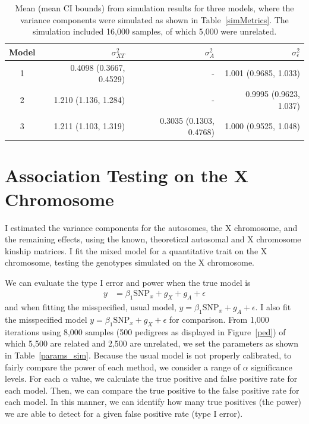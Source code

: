 \documentclass[11pt]{article} %
\newcommand{\snpX}{\mbox{SNP}_x}
\begin{document}
\bgroup
\def\arraystretch{1.5}
\begin{table}[ht]
\centering
\begin{tabular}{crrr}
  \hline
 Model & $\sigma^2_{XT}$ &  $\sigma^2_A$& $\sigma^2_\epsilon$  \\ 
  \hline
1 & 0.4098 (0.3667, 0.4529)& -  & 1.001 (0.9685, 1.033)  \\
2 &1.210 (1.136, 1.284)& - & 0.9995 (0.9623, 1.037) \\
3 & 1.211 (1.103, 1.319) & 0.3035 (0.1303, 0.4768) & 1.000 (0.9525, 1.048)\\ 
   \hline
\end{tabular}
\caption{Mean (mean CI bounds) from simulation results for three models, where the variance components were simulated as shown in Table~\ref{simMetrics}. The simulation included 16,000 samples, of which 5,000 were unrelated.} \label{varComp_sim_results}
\end{table}



\section*{Association Testing on the X Chromosome}
I estimated the variance components for the autosomes, the X chromosome, and the remaining effects, using the known, theoretical autosomal and X chromosome kinship matrices.
I fit the mixed model for a quantitative trait on the X chromosome, testing the genotypes simulated on the X chromosome.

We can evaluate the type I error and power when the true model is 
\begin{align}
 y&=\beta_1 \snpX + g_X + g_A + \epsilon 
\end{align}
and when fitting the misspecified, usual model, $y=\beta_1 \snpX + g_A + \epsilon$. I also fit the 
misspecified model $y=\beta_1 \snpX + g_X + \epsilon$ for comparison.
From 1,000 iterations using 8,000 samples (500 pedigrees as displayed in Figure~\ref{ped}) of which 5,500 are related and 2,500 are unrelated, we set the 
parameters as shown in Table~\ref{params_sim}.
Because the usual model is not properly calibrated, to fairly compare the power of each method, we consider a range of $\alpha$ significance levels. For each $\alpha$ value, we calculate the true positive and false positive rate for each model. Then, we can compare the true positive to the false positive rate for each model.
In this manner, we can identify how many true positives (the power) we are able to detect for a given false positive rate (type I error). 
\end{document}
